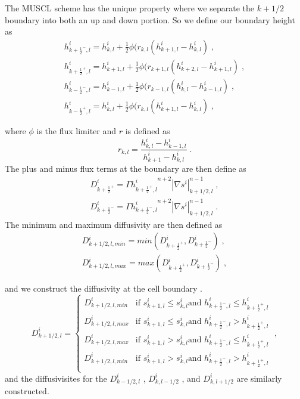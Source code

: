 \documentclass{article}
\begin{document}
The MUSCL scheme has the unique property where we separate the $k+1/2$ boundary into both an up and down portion. So we define our boundary height as 
\begin{subequations}
\begin{gather}
h^i_{k+\frac{1}{2}^-,l} = h^i_{k,l} + \frac{1}{2}\phi(r_{k,l}(h^i_{k+1,l}-h^i_{k,l})\; ,\\
h^i_{k+\frac{1}{2}^+,l} = h^i_{k+1,l} + \frac{1}{2}\phi(r_{k+1,l}(h^i_{k+2,l}-h^i_{k+1,l})\; ,\\
h^i_{k-\frac{1}{2}^-,l} = h^i_{k-1,l} + \frac{1}{2}\phi(r_{k-1,l}(h^i_{k,l}-h^i_{k-1,l})\; ,\\
h^i_{k-\frac{1}{2}^+,l} = h^i_{k,l} + \frac{1}{2}\phi(r_{k,l}(h^i_{k+1,l}-h^i_{k,l})\; ,
\end{gather}
\end{subequations}

where $\phi$ is the flux limiter and $r$ is defined as
\begin{equation}
r_{k,l} = \frac{h^i_{k,l}-h^i_{k-1,l}}{h^i_{k+1}-h^i_{k,l}}\; .
\end{equation}
The plus and minus flux terms at the boundary are then define as
\begin{subequations}
\begin{gather}
D^i_{k+\frac{1}{2}^+} = \Gamma {h^i_{k+\frac{1}{2}^+,l}}^{n+2}|\nabla s^i|^{n-1}_{k+1/2,l}\; ,\\
D^i_{k+\frac{1}{2}^-} = \Gamma {h^i_{k+\frac{1}{2}^-,l}}^{n+2}|\nabla s^i|^{n-1}_{k+1/2,l}\; .
\end{gather}
\end{subequations}
The minimum and maximum diffusivity are then defined as 
\begin{subequations}
\begin{gather}
D^i_{k+1/2,l,min} = min(D^i_{k+\frac{1}{2}^+}, D^i_{k+\frac{1}{2}^-} ) \; ,\\
 D^i_{k+1/2,l,max}  = max(D^i_{k+\frac{1}{2}^+}, D^i_{k+\frac{1}{2}^-}) \; ,
\end{gather}
\end{subequations}


and we construct the diffusivity at the cell boundary \citep{Jarosch2013}.
\begin{equation}
    D^i_{k+1/2,l}= 
\begin{cases}
    D^i_{k+1/2,l,min}& \text{if } s^i_{k+1,l} \leq s^i_{k,l} \text{and } h^i_{k+\frac{1}{2}^-,l} \leq h^i_{k+\frac{1}{2}^+,l}\\
    D^i_{k+1/2,l,max}              & \text{if }  s^i_{k+1,l} \leq s^i_{k,l} \text{and } h^i_{k+\frac{1}{2}^-,l} > h^i_{k+\frac{1}{2}^+,l}\\
    D^i_{k+1/2,l,max}& \text{if } s^i_{k+1,l} > s^i_{k,l} \text{and } h^i_{k+\frac{1}{2}^-,l} \leq h^i_{k+\frac{1}{2}^+,l}\\
    D^i_{k+1/2,l,min}              & \text{if }  s^i_{k+1,l} > s^i_{k,l} \text{and } h^i_{k+\frac{1}{2}^-,l} > h^i_{k+\frac{1}{2}^+,l}\\
\end{cases} \; ,
\end{equation}
and the diffusivisites for the $D^i_{k-1/2,l}$ , $D^i_{k,l-1/2}$ , and $D^i_{k,l+1/2}$ are similarly constructed. 
\end{document}
